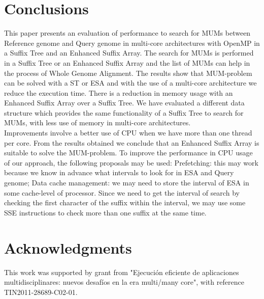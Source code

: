 \documentclass[runningheads,a4paper]{llncs}
\begin{document}
\section{Conclusions}
This paper presents an evaluation of performance to search for MUMs between Reference genome and Query genome in multi-core architectures with OpenMP in a Suffix Tree and an Enhanced Suffix Array. The search for MUMs is performed in a Suffix Tree or an Enhanced Suffix Array and the list of MUMs can help in the process of Whole Genome Alignment. The results show that MUM-problem can be solved with a ST or ESA and with the use of a multi-core architecture we reduce the execution time. There is a reduction in memory usage with an Enhanced Suffix Array over a Suffix Tree. We have evaluated a different data structure which provides the same functionality of a Suffix Tree to search for MUMs, with less use of memory in multi-core architectures.\\
Improvements involve a better use of CPU when we have more than one thread per core. From the results obtained we conclude that an Enhanced Suffix Array is suitable to solve the MUM-problem. To improve the performance in CPU usage of our approach, the following proposals may be used: Prefetching: this may work because we know in advance what intervals to look for in ESA and Query genome; Data cache management: we may need to store the interval of ESA in some cache-level of processor. Since we need to get the interval of search by checking the first character of the suffix within the interval, we may use some SSE instructions to check more than one suffix at the same time.
\section{Acknowledgments}
This work was supported by grant from "Ejecuci\'on eficiente de aplicaciones multidisciplinares: nuevos desaf\'ios en la era multi/many core", with reference TIN2011-28689-C02-01.

  
\end{document}

